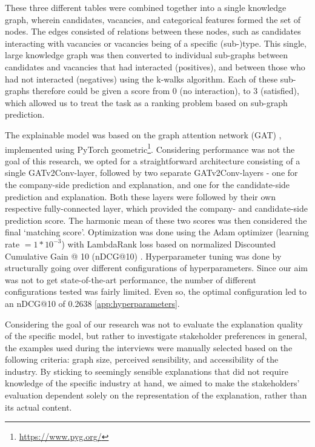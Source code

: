These three different tables were combined together into a single knowledge graph, wherein candidates, vacancies, and categorical features formed the set of nodes. The edges consisted of relations between these nodes, such as candidates interacting with vacancies or vacancies being of a specific (sub-)type. This single, large knowledge graph was then converted to individual sub-graphs between candidates and vacancies that had interacted (positives), and between those who had not interacted (negatives) using the k-walks algorithm. Each of these sub-graphs therefore could be given a score from 0 (no interaction), to 3 (satisfied), which allowed us to treat the task as a ranking problem based on sub-graph prediction.

The explainable model was based on the graph attention network (GAT) \cite{velivckovic2017graph}, implemented using PyTorch geometric\footnote{\url{https://www.pyg.org/}}. Considering performance was not the goal of this research, we opted for a straightforward architecture consisting of a single GATv2Conv-layer, followed by two separate GATv2Conv-layers - one for the company-side prediction and explanation, and one for the candidate-side prediction and explanation. Both these layers were followed by their own respective fully-connected layer, which provided the company- and candidate-side prediction score. The harmonic mean of these two scores was then considered the final `matching score'. Optimization was done using the Adam optimizer \cite{kingma2014adam} (learning rate $= 1 * 10^{-3}$) with LambdaRank loss based on normalized Discounted Cumulative Gain @ 10 (nDCG@10) \cite{burges2006learning}. Hyperparameter tuning was done by structurally going over different configurations of hyperparameters. Since our aim was not to get state-of-the-art performance, the number of different configurations tested was fairly limited. Even so, the optimal configuration led to an nDCG@10 of 0.2638 \cref{app:hyperparameters}.

Considering the goal of our research was not to evaluate the explanation quality of the specific model, but rather to investigate stakeholder preferences in general, the examples used during the interviews were manually selected based on the following criteria: graph size, perceived sensibility, and accessibility of the industry. By sticking to seemingly sensible explanations that did not require knowledge of the specific industry at hand, we aimed to make the stakeholders' evaluation dependent solely on the representation of the explanation, rather than its actual content. 

